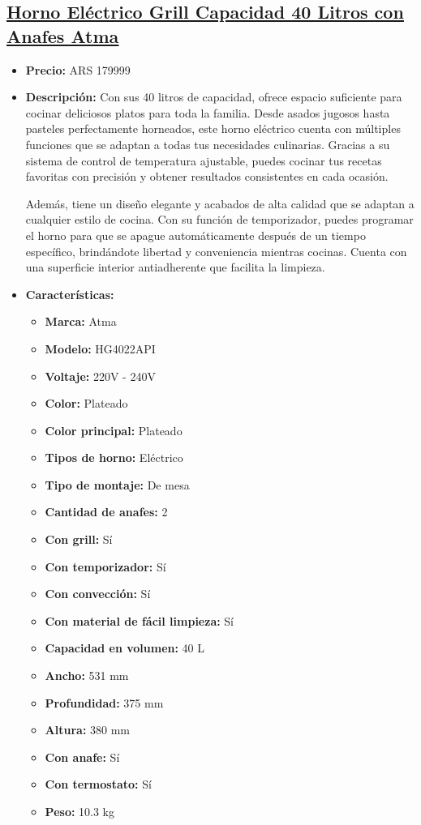 \documentclass{article}
\begin{document}
\begin{adjustwidth}{2em}{}

\subsection{\uline{\href{https://www.mercadolibre.com.ar/horno-electrico-grill-capacidad-40-litros-con-anafes-atma/p/MLA23686313}{Horno Eléctrico Grill Capacidad 40 Litros con Anafes Atma}}}
\begin{itemize}
    \item \textbf{Precio:} ARS 179999
    \item \textbf{Descripción:} Con sus 40 litros de capacidad, ofrece espacio suficiente para cocinar deliciosos platos para toda la familia. Desde asados jugosos hasta pasteles perfectamente horneados, este horno eléctrico cuenta con múltiples funciones que se adaptan a todas tus necesidades culinarias. Gracias a su sistema de control de temperatura ajustable, puedes cocinar tus recetas favoritas con precisión y obtener resultados consistentes en cada ocasión. 

Además, tiene un diseño elegante y acabados de alta calidad que se adaptan a cualquier estilo de cocina. Con su función de temporizador, puedes programar el horno para que se apague automáticamente después de un tiempo específico, brindándote libertad y conveniencia mientras cocinas. Cuenta con una superficie interior antiadherente que facilita la limpieza.
    \item \textbf{Características:} 
    \begin{itemize}
        \item \textbf {Marca:} Atma
    \item \textbf {Modelo:} HG4022API
    \item \textbf {Voltaje:} 220V - 240V
    \item \textbf {Color:} Plateado
    \item \textbf {Color principal:} Plateado
    \item \textbf {Tipos de horno:} Eléctrico
    \item \textbf {Tipo de montaje:} De mesa
    \item \textbf {Cantidad de anafes:} 2
    \item \textbf {Con grill:} Sí
    \item \textbf {Con temporizador:} Sí
    \item \textbf {Con convección:} Sí
    \item \textbf {Con material de fácil limpieza:} Sí
    \item \textbf {Capacidad en volumen:} 40 L
    \item \textbf {Ancho:} 531 mm
    \item \textbf {Profundidad:} 375 mm
    \item \textbf {Altura:} 380 mm
    \item \textbf {Con anafe:} Sí
    \item \textbf {Con termostato:} Sí
    \item \textbf {Peso:} 10.3 kg
    \end{itemize}
\end{itemize}


\end{adjustwidth}
\end{document}
